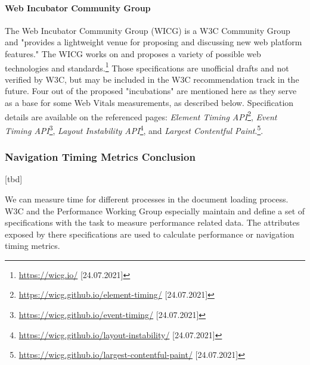 


\paragraph{Web Incubator Community Group}

The Web Incubator Community Group (WICG) is a W3C Community Group and "provides a lightweight venue for proposing and discussing new web platform features." %
The WICG works on and proposes a variety of possible web technologies and standards.\footnote{\url{https://wicg.io/} [24.07.2021]}
Those specifications are unofficial drafts and not verified by W3C, but may be included in the W3C recommendation track in the future.
Four out of the proposed "incubations" are mentioned here as they serve as a base for some Web Vitals measurements, as described below.
Specification details are available on the referenced pages:
\textit{Element Timing API}\footnote{\url{https://wicg.github.io/element-timing/} [24.07.2021]}, 
\textit{Event Timing API}\footnote{\url{https://wicg.github.io/event-timing/} [24.07.2021]},
\textit{Layout Instability API}\footnote{\url{https://wicg.github.io/layout-instability/} [24.07.2021]}, and
\textit{Largest Contentful Paint}.\footnote{\url{https://wicg.github.io/largest-contentful-paint/} [24.07.2021]}.








\subsubsection{Navigation Timing Metrics Conclusion}

[tbd]

We can measure time for different processes in the document loading process.
W3C and the Performance Working Group especially maintain and define a set of specifications with the task to measure performance related data.
The attributes exposed by there specifications are used to calculate performance or navigation timing metrics.

